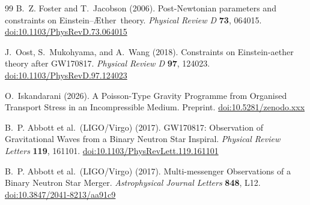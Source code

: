 \documentclass[12pt,a4paper]{article}
\providecommand{\doi}[1]{\href{https://doi.org/#1}{doi:#1}}
\newcommand{\Aether}{\AE ther}
\begin{document}
\begin{thebibliography}{99}
B.~Z. Foster and T.~Jacobson (2006).
\newblock Post-Newtonian parameters and constraints on Einstein--\Aether\
  theory.
\newblock \emph{Physical Review D} \textbf{73}, 064015.
\newblock \doi{10.1103/PhysRevD.73.064015}


J.~Oost, S.~Mukohyama, and A.~Wang (2018).
\newblock Constraints on Einstein-aether theory after GW170817.
\newblock \emph{Physical Review D} \textbf{97}, 124023.
\newblock \doi{10.1103/PhysRevD.97.124023}

O.~Iskandarani (2026).
\newblock A Poisson-Type Gravity Programme from Organised Transport Stress
  in an Incompressible Medium.
\newblock Preprint. \doi{10.5281/zenodo.xxx}

B.~P. Abbott et al.\ (LIGO/Virgo) (2017).
\newblock GW170817: Observation of Gravitational Waves from a Binary Neutron
  Star Inspiral.
\newblock \emph{Physical Review Letters} \textbf{119}, 161101.
\newblock \doi{10.1103/PhysRevLett.119.161101}

B.~P. Abbott et al.\ (LIGO/Virgo) (2017).
\newblock Multi-messenger Observations of a Binary Neutron Star Merger.
\newblock \emph{Astrophysical Journal Letters} \textbf{848}, L12.
\newblock \doi{10.3847/2041-8213/aa91c9}

\end{thebibliography}
\end{document}
